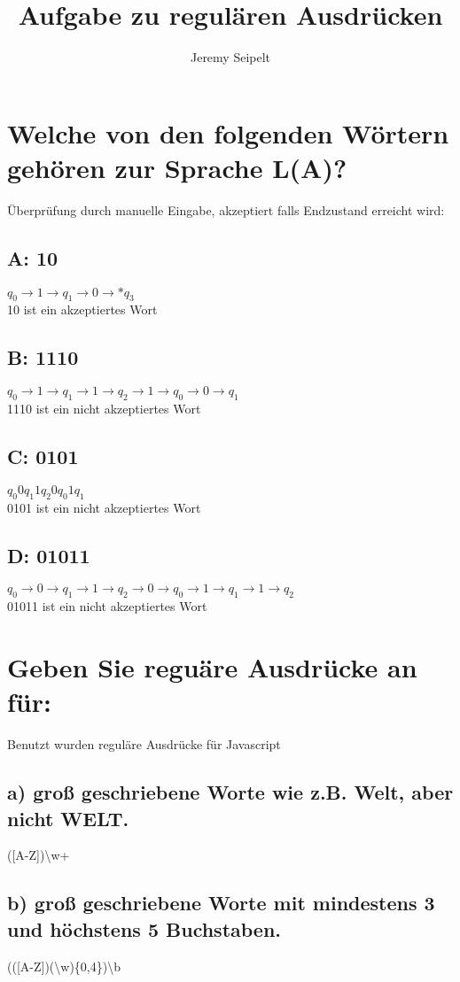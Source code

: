 \documentclass[11pt]{article} %
\title{Aufgabe zu regulären Ausdrücken}
\author{Jeremy Seipelt}
\begin{document}
\maketitle

\section{Welche von den folgenden Wörtern gehören zur Sprache L(A)?}
Überprüfung durch manuelle Eingabe, akzeptiert falls Endzustand erreicht wird:
\subsection{A: 10 }
$q_{0}\rightarrow1\rightarrow q_{1}\rightarrow 0 \rightarrow *q_{3}$\\ 10 ist ein akzeptiertes Wort
\subsection{B: 1110 }
$q_{0} \rightarrow 1 \rightarrow q_{1} \rightarrow 1\rightarrow q_{2} \rightarrow 1\rightarrow q_{0}\rightarrow 0\rightarrow q_{1}$\\ 1110 ist ein nicht akzeptiertes Wort
\subsection{C: 0101 } 
$q_{0} 0 q_{1} 1 q_{2} 0 q_{0} 1 q_{1}$\\ 0101 ist ein nicht akzeptiertes Wort
\subsection{D: 01011 }
$q_{0}\rightarrow 0\rightarrow q_{1} \rightarrow 1 \rightarrow q_{2} \rightarrow 0\rightarrow q_{0} \rightarrow 1 \rightarrow q_{1} \rightarrow 1 \rightarrow q_{2}$\\ 01011 ist ein nicht akzeptiertes Wort
\section{Geben Sie reguäre Ausdrücke an für:}
Benutzt wurden reguläre Ausdrücke für Javascript
\subsection{a) groß geschriebene Worte wie z.B. Welt, aber nicht WELT.}
([A-Z])\textbackslash w+
\subsection{b) groß geschriebene Worte mit mindestens 3 und höchstens 5 Buchstaben.}
(([A-Z])(\textbackslash w)\{0,4\})\textbackslash b
\end{document}
